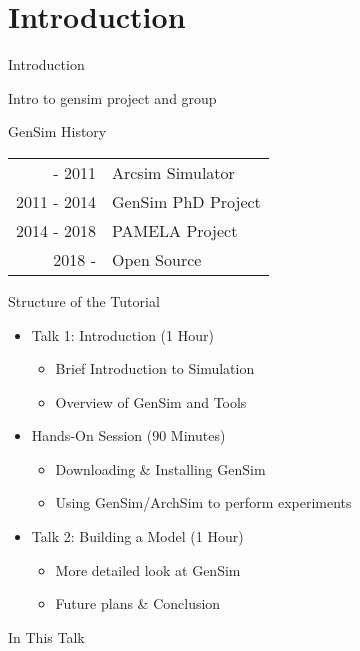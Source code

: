 
\section{Introduction}

\begin{frame}[t]{Introduction}

Intro to gensim project and group

\end{frame}

\begin{frame}{GenSim History}


\centering
\begin{tabular}{r l}
\phantom{0000} - 2011 & Arcsim Simulator \\
2011 - 2014 & GenSim PhD Project \\
2014 - 2018 & PAMELA Project \\
2018 - \phantom{0000}        & Open Source
\end{tabular}

\end{frame}

\begin{frame}{Structure of the Tutorial}

\begin{itemize}
\item Talk 1: Introduction (1 Hour)
\begin{itemize}
	\item Brief Introduction to Simulation
	\item Overview of GenSim and Tools
\end{itemize}

\item Hands-On Session (90 Minutes)
\begin{itemize}
	\item Downloading \& Installing GenSim
	\item Using GenSim/ArchSim to perform experiments
\end{itemize}

\item Talk 2: Building a Model (1 Hour)
\begin{itemize}
	\item More detailed look at GenSim
	\item Future plans \& Conclusion
\end{itemize}

\end{itemize}

\end{frame}

\begin{frame}{In This Talk}
	\tableofcontents
\end{frame}	
